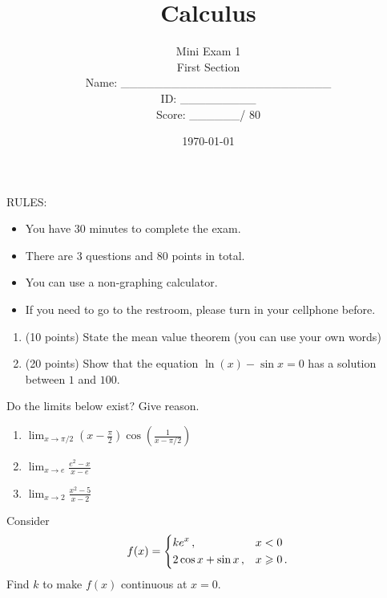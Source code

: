 \documentclass[12pt]{amsart}
\title{ Calculus }
\author{  Mini Exam 1 \\ First Section \\ \vspace{1cm} Name: \_\_\_\_\_\_\_\_\_\_\_\_\_\_\_\_\_\_\_\_\_\_\_\_\_  
\\ \vspace{1cm} ID: \_\_\_\_\_\_\_\_\_ \\ \vspace{1cm} Score: \_\_\_\_\_\_/ 80}
\date{\today}
\begin{document}
\maketitle


RULES:
\begin{itemize}
	\item You have 30 minutes to complete the exam.
	\item There are 3 questions and 80 points in total.
	\item You can use a non-graphing calculator.
	\item If you need to go to the restroom, please turn in your cellphone before.
\end{itemize}

\newpage

\begin{problem}[30 points]
\begin{enumerate}
	\item (10 points) State the mean value theorem (you can use your own words)
	      \vspace{8cm}
	\item (20 points) Show that the equation $\ln(x) - \sin x = 0$ has a solution between $1$ and $100$.
\end{enumerate}
\end{problem}

\pagebreak

\begin{problem}[30 points]
Do the limits below exist? Give reason.
\begin{enumerate}
	\item $\displaystyle \lim_{x \to \pi/2} \left(x-\frac{\pi}{2}\right) \cos\left( \frac{1}{x-\pi/2} \right)$
	      \vspace{5cm}
	\item $\displaystyle \lim_{x \to e} \frac{e^2 -x}{x-e} $
	      \vspace{5cm}
	\item $\displaystyle \lim_{x \to 2} \frac{x^2 - 5}{x-2}$
	      \vspace{5cm}
\end{enumerate}
\end{problem}

\newpage

\begin{problem}[20 points] Consider
\begin{equation*}
	f(x) = \begin{dcases}
		ke^{x} \,,           & x<0         \\
		2\cos x + \sin x \,, & x\geq 0 \,.
	\end{dcases}
\end{equation*}
Find $k$ to make $f(x)$ continuous at $x = 0$.

\end{problem}


\printbibliography
%
%
\end{document}
